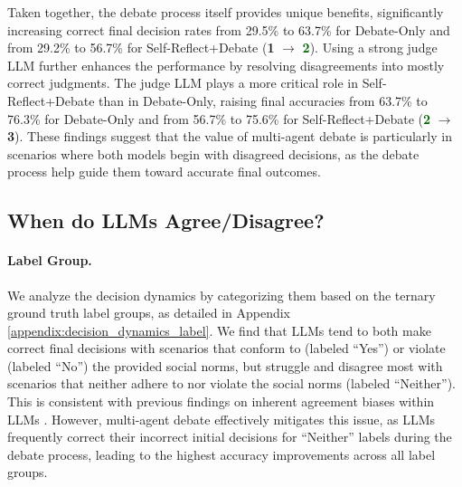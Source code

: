 Taken together, the debate process itself provides unique benefits, significantly increasing correct final decision rates from 29.5\% to 63.7\% for Debate-Only and from 29.2\% to 56.7\% for Self-Reflect+Debate (\textcolor{darkpurple}{\textbf{1}} $\rightarrow$ \textcolor{darkgreen}{\textbf{2}}). Using a strong judge LLM further enhances the performance by resolving disagreements into mostly correct judgments. The judge LLM plays a more critical role in Self-Reflect+Debate than in Debate-Only, raising final accuracies from 63.7\% to 76.3\% for Debate-Only and from 56.7\% to 75.6\% for Self-Reflect+Debate (\textcolor{darkgreen}{\textbf{2}} $\rightarrow$ \textcolor{bblue}{\textbf{3}}). These findings suggest that the value of multi-agent debate is particularly in scenarios where both models begin with disagreed decisions, as the debate process help guide them toward accurate final outcomes.



\subsection{When do LLMs Agree/Disagree?}
\label{sec:llms_disagree}

\paragraph{Label Group.}
We analyze the decision dynamics by categorizing them based on the ternary ground truth label groups, as detailed in Appendix \ref{appendix:decision_dynamics_label}. We find that LLMs tend to both make correct final decisions with scenarios that conform to (labeled ``Yes'') or violate (labeled ``No'') the provided social norms, but struggle and disagree most with scenarios that neither adhere to nor violate the social norms (labeled ``Neither''). This is consistent with previous findings on inherent agreement biases within LLMs \cite{perez2022discovering, huang2024trustllm}. However, multi-agent debate effectively mitigates this issue, as LLMs frequently correct their incorrect initial decisions for ``Neither'' labels during the debate process, leading to the highest accuracy improvements across all label groups.


